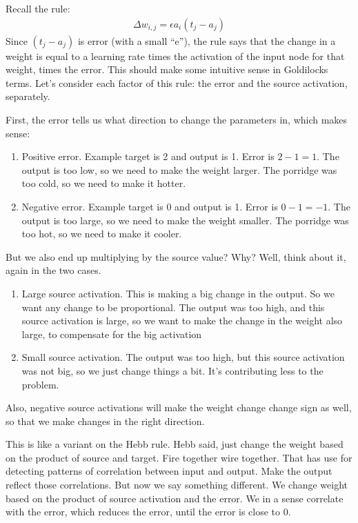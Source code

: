 Recall the rule:
\begin{eqnarray*}
\Delta w_{i,j}  =  \epsilon a_i (t_j - a_j)
\end{eqnarray*}
Since $(t_j - a_j)$ is error  (with a small ``e''), the rule says that the change in a weight is equal to a learning rate times the activation of the input node for that weight, times the error. This should make some intuitive sense in Goldilocks terms. Let's consider each factor of this rule: the error and the source activation, separately.

First, the error tells us what direction to change the parameters in, which makes sense:
\begin{enumerate}
\item Positive error. Example target is 2 and output is 1. Error is $2-1 = 1$. The output is too low, so we need to make the weight larger. The porridge was too cold, so we need to make it hotter. 
\item Negative error. Example target is 0 and output is 1. Error is $0-1 = -1$. The output is too large, so we need to make the weight smaller. The porridge was too hot, so we need to make it cooler. 
\end{enumerate}

But we also end up multiplying by the source value? Why? Well, think about it, again in the two cases.
\begin{enumerate}
\item Large source activation. This is making a big change in the output. So we want any change to be proportional. The output was too high, and this source activation is large, so we want to make the change in the weight also large, to compensate for the big activation
\item Small source activation. The output was too high, but this source activation was not big, so we just change things a bit. It's contributing less to the problem.
\end{enumerate}
Also, negative source activations will make the weight change change sign as well, so that we make changes in the right direction. %

This is like a variant on the Hebb rule. Hebb said, just change the weight based on the product of source and target. Fire together wire together. That has use for detecting patterns of correlation between input and output. Make the output reflect those correlations. But now we say something different. We change weight based on the product of source activation and the error. We in a sense correlate with the error, which reduces the error, until the error is close to 0.

